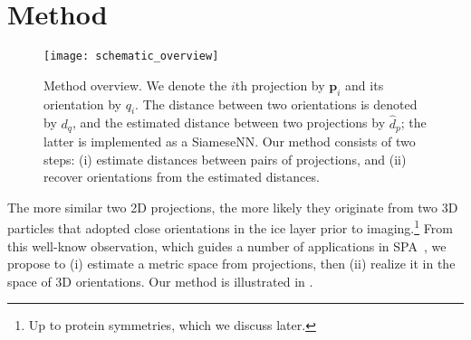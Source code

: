 \section{Method}

\begin{figure}
    \centering
    \texttt{[image: schematic\_overview]}
    \caption{
        Method overview.
        We denote the $i$th projection by $\mathbf{p}_i$ and its orientation by $q_i$. The distance between two orientations is denoted by $d_q$, and the estimated distance between two projections by $\widehat{d}_p$; the latter is implemented as a SiameseNN.
        Our method consists of two steps: (i) estimate distances between pairs of projections, and (ii) recover orientations from the estimated distances.
         
    }
    \label{fig:schematic:overview}
\end{figure}

The more similar two 2D projections, the more likely they originate from two 3D particles that adopted close orientations in the ice layer prior to imaging.\footnote{Up to protein symmetries, which we discuss later.}
From this well-know observation, which guides a number of applications in SPA~\cite{frank2006three}, we propose to (i) estimate a metric space from projections, then (ii) realize it in the space of 3D orientations.
Our method is illustrated in .

 

